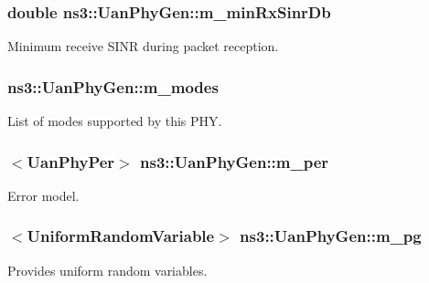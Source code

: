 \subsubsection[{\texorpdfstring{m\+\_\+min\+Rx\+Sinr\+Db}{m_minRxSinrDb}}]{\setlength{\rightskip}{0pt plus 5cm}double ns3\+::\+Uan\+Phy\+Gen\+::m\+\_\+min\+Rx\+Sinr\+Db\hspace{0.3cm}{\ttfamily [private]}}\hypertarget{classns3_1_1UanPhyGen_aa44c213593b93a7d0052819240e54a69}{}\label{classns3_1_1UanPhyGen_aa44c213593b93a7d0052819240e54a69}


Minimum receive S\+I\+NR during packet reception. 

\subsubsection[{\texorpdfstring{m\+\_\+modes}{m_modes}}]{ ns3\+::\+Uan\+Phy\+Gen\+::m\+\_\+modes\hspace{0.3cm}{\ttfamily [private]}}\hypertarget{classns3_1_1UanPhyGen_afbefa28eede3c14460aa7d69961de317}{}\label{classns3_1_1UanPhyGen_afbefa28eede3c14460aa7d69961de317}


List of modes supported by this P\+HY. 

\subsubsection[{\texorpdfstring{m\+\_\+per}{m_per}}]{$<${\bf Uan\+Phy\+Per}$>$ ns3\+::\+Uan\+Phy\+Gen\+::m\+\_\+per\hspace{0.3cm}{\ttfamily [private]}}\hypertarget{classns3_1_1UanPhyGen_a14a4a149970cb2d9f0041a52e7934896}{}\label{classns3_1_1UanPhyGen_a14a4a149970cb2d9f0041a52e7934896}


Error model. 

\subsubsection[{\texorpdfstring{m\+\_\+pg}{m_pg}}]{$<${\bf Uniform\+Random\+Variable}$>$ ns3\+::\+Uan\+Phy\+Gen\+::m\+\_\+pg\hspace{0.3cm}{\ttfamily [private]}}\hypertarget{classns3_1_1UanPhyGen_a950a13a6d3bca0316560f3d985af516a}{}\label{classns3_1_1UanPhyGen_a950a13a6d3bca0316560f3d985af516a}
Provides uniform random variables. 
